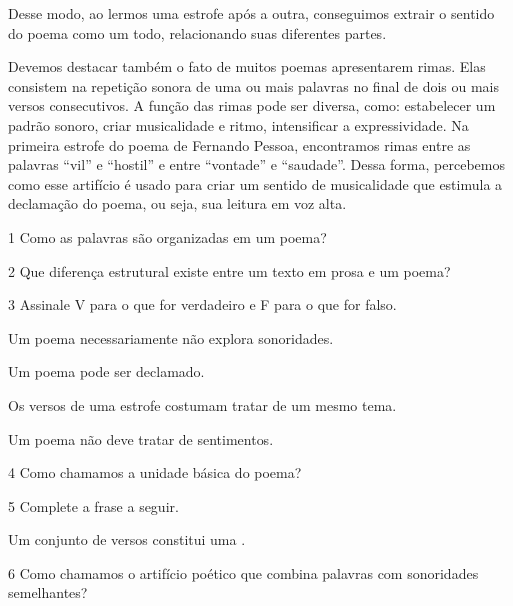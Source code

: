 {

Desse modo, ao lermos uma estrofe após a outra, conseguimos
extrair o sentido do poema como um todo, relacionando suas diferentes
partes.

Devemos destacar também o fato de muitos poemas apresentarem rimas. Elas
consistem na repetição sonora de uma ou mais palavras no final de dois
ou mais versos consecutivos. A função das rimas pode ser diversa, como:
estabelecer um padrão sonoro, criar musicalidade e ritmo, intensificar a
expressividade. Na primeira estrofe do poema de Fernando
Pessoa, encontramos rimas entre as palavras “vil” e “hostil” e entre “vontade”
e “saudade”. Dessa forma, percebemos como esse artifício é usado
para criar um sentido de musicalidade que estimula a declamação do
poema, ou seja, sua leitura em voz alta.}


\num{1} Como as palavras são organizadas em um poema?


\num{2} Que diferença estrutural existe entre um texto em prosa e um poema?


\num{3} Assinale V para o que for verdadeiro e F para o que for falso.

\begin{boxlist}
 Um poema necessariamente não explora sonoridades.

 Um poema pode ser declamado.

 Os versos de uma estrofe costumam tratar de um mesmo tema.

 Um poema não deve tratar de sentimentos.
\end{boxlist}

\num{4} Como chamamos a unidade básica do poema?


\num{5} Complete a frase a seguir.

Um conjunto de versos constitui uma .

\num{6} Como chamamos o artifício poético que combina palavras com
sonoridades semelhantes?

